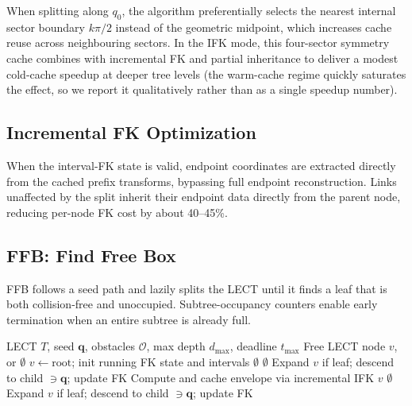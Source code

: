 \documentclass[journal]{IEEEtran}
\begin{document}
When splitting along $q_0$, the algorithm preferentially selects the
nearest internal sector boundary $k\pi/2$ instead of the geometric
midpoint, which increases cache reuse across neighbouring sectors. In
the IFK mode, this four-sector symmetry cache combines with incremental
FK and partial inheritance to deliver a modest cold-cache speedup at
deeper tree levels (the warm-cache regime quickly saturates the
effect, so we report it qualitatively rather than as a single
speedup number).

\subsection{Incremental FK Optimization}

When the interval-FK state is valid, endpoint coordinates are extracted
directly from the cached prefix transforms, bypassing full endpoint
reconstruction. Links unaffected by the split inherit their endpoint
data directly from the parent node, reducing per-node FK cost by about
40--45\%.

\subsection{FFB: Find Free Box}

FFB follows a seed path and lazily splits the LECT until it finds a leaf
that is both collision-free and unoccupied. Subtree-occupancy counters
enable early termination when an entire subtree is already full.

\begin{algorithm}[t]
\caption{Find Free Box (FFB)}\label{alg:ffb}
\footnotesize
\begin{algorithmic}[1]
\REQUIRE LECT $T$, seed $\bm{q}$, obstacles $\mathcal{O}$,
  max depth $d_{\max}$, deadline $t_{\max}$
\ENSURE Free LECT node $v$, or $\emptyset$
\STATE $v \leftarrow \text{root}$; init running FK state and intervals
\WHILE{\TRUE}
    \RETURN $\emptyset$
  \ENDIF
      \RETURN $\emptyset$
    \ENDIF
    \STATE Expand $v$ if leaf; descend to child $\ni \bm{q}$; update FK
  \ELSE
      \STATE Compute and cache envelope via incremental IFK
    \ENDIF
      \RETURN $v$ \hfill{}
    \ELSE
        \RETURN $\emptyset$
      \ENDIF
      \STATE Expand $v$ if leaf; descend to child $\ni \bm{q}$; update FK
    \ENDIF
  \ENDIF
\ENDWHILE
\end{algorithmic}
\end{algorithm}
\end{document}
